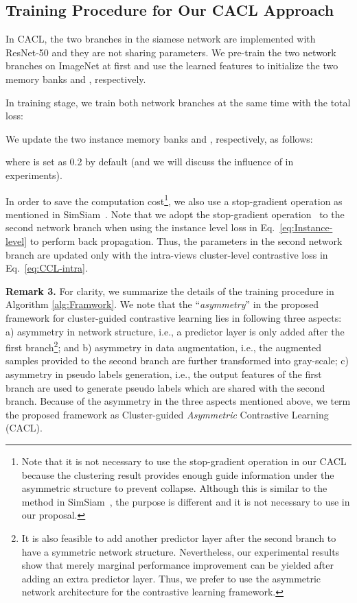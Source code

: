 \documentclass[journal]{IEEEtran}
\def\ie{i.e.}
\newcommand{\myparagraph}[1]{\noindent\textbf{#1.}}
\begin{document}
\subsection{Training Procedure for Our CACL Approach}






In CACL, the two branches in the siamese network are implemented with ResNet-50 \cite{he:CVPR16resnet} and they are not sharing parameters. We pre-train the two network branches on ImageNet at first and use the learned features to initialize the two memory banks  and , respectively. 

In  training stage, we train both network branches at the same time with the total loss:


We update the two instance memory banks  and , respectively, as follows:

where   is set as 0.2 by default (and we will discuss the influence of   in experiments). 


In order to save the computation cost\footnote{Note that it is not necessary to use the stop-gradient operation in our CACL because the clustering result provides enough guide information under the asymmetric structure to prevent collapse. Although this is similar to the method in SimSiam~\cite{Chen:arxiv20}, the purpose is different and it is not necessary to use in our proposal.}, we also use a stop-gradient operation as mentioned in SimSiam~\cite{Chen:arxiv20}.
Note that we adopt the stop-gradient operation~\cite{Chen:arxiv20} to the second network branch  when using the instance level loss  in Eq.~\eqref{eq:Instance-level} to perform back propagation. 
Thus, the parameters  in the second network branch are updated only with the intra-views cluster-level contrastive loss  in Eq.~\eqref{eq:CCL-intra}.




 
\myparagraph{Remark 3} For clarity, we summarize the details of the training procedure in Algorithm \ref{alg:Framwork}. 
We note that the ``\emph{asymmetry}'' in the proposed framework for cluster-guided contrastive learning lies in following three aspects:
a) asymmetry in network structure, \ie, a predictor layer is only added after the first branch\footnote{ It is also feasible to add another predictor layer after the second branch to have a symmetric network structure. Nevertheless, our experimental results show that merely marginal performance improvement can be yielded after adding an extra predictor layer. Thus, we prefer to use the asymmetric network architecture for the contrastive learning framework.}; and b) asymmetry in data augmentation, \ie, the augmented samples provided to the second branch are further transformed into gray-scale; c) asymmetry in pseudo labels generation, \ie, the output features of the first branch are used to generate pseudo labels which are shared with the second branch.  Because of the asymmetry in the three aspects mentioned above, we term the proposed framework as Cluster-guided \emph{Asymmetric} Contrastive Learning (CACL).  
\end{document}
